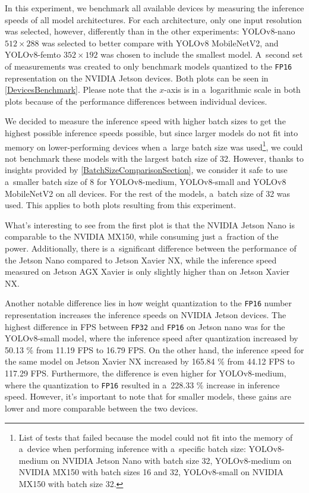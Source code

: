 In this experiment, we benchmark all available devices by measuring the
inference speeds of all model architectures. For each architecture, only one
input resolution was selected, however, differently than in the other
experiments: YOLOv8-nano $512 \times 288$ was selected to better compare with
YOLOv8 MobileNetV2, and YOLOv8-femto $352 \times 192$ was chosen to include the
smallest model. A~second set of measurements was created to only benchmark
models quantized to the \texttt{FP16} representation on the NVIDIA Jetson
devices. Both plots can be seen in \autoref{DevicesBenchmark}. Please note that
the $x$-axis is in a~logarithmic scale in both plots because of the performance
differences between individual devices.

We decided to measure the inference speed with higher batch sizes to get the
highest possible inference speeds possible, but since larger models do not fit
into memory on
lower-performing devices when a~large batch size was
used\footnote{List of tests that failed because the model could not fit into
the memory of a~device when performing inference with a~specific batch size:
YOLOv8-medium on NVIDIA Jetson Nano with batch size 32, YOLOv8-medium on NVIDIA
MX150 with batch sizes 16 and 32, YOLOv8-small on NVIDIA MX150 with batch size
32.}, we could not benchmark these models with the largest batch size of 32.
However, thanks to insights provided by \autoref{BatchSizeComparisonSection}, we
consider it safe to use a~smaller batch size of 8 for YOLOv8-medium,
YOLOv8-small and YOLOv8 MobileNetV2 on all devices. For the rest of the models,
a~batch size of 32 was used. This applies to both plots resulting from this
experiment.

What's interesting to see from the first plot is that the NVIDIA Jetson Nano is
comparable to the NVIDIA MX150, while consuming just a~fraction of the power.
Additionally, there is a~significant difference between the performance of the
Jetson Nano compared to Jetson Xavier NX, while the inference speed measured on
Jetson AGX Xavier is only slightly higher than on Jetson Xavier NX.

Another notable difference lies in how weight quantization to the \texttt{FP16}
number representation increases the inference speeds on NVIDIA Jetson devices.
The highest difference in FPS between \texttt{FP32} and \texttt{FP16} on Jetson
nano was for the YOLOv8-small model, where the inference speed after
quantization increased by \num{50.13} \% from \num{11.19} FPS to \num{16.79}
FPS. On the other hand, the inference speed for the same model on Jetson Xavier
NX increased by \num{165.84} \% from \num{44.12} FPS to \num{117.29} FPS.
Furthermore, the difference is even higher for YOLOv8-medium, where the
quantization to \texttt{FP16} resulted in a~\num{228.33} \% increase in
inference speed. However, it's important to note that for smaller models, these
gains are lower and more comparable between the two devices.

